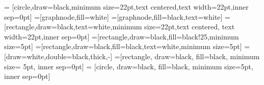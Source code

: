 \usepackage{pgfplots}
\pgfplotsset{compat=newest}
\newlength\figureheight
\newlength\figurewidth
\setlength{\figurewidth}{0.85\columnwidth}
\setlength{\figureheight}{0.618\figurewidth} %

\usepackage{tikz}
\usetikzlibrary{fadings}
\usetikzlibrary{arrows,shapes,plotmarks,decorations.pathmorphing}
\usetikzlibrary{circuits}
\usetikzlibrary{intersections}
\usetikzlibrary{scopes, arrows, fadings, patterns}
\usetikzlibrary{%
    decorations.pathreplacing,%
    decorations.pathmorphing%
}
\usetikzlibrary{positioning}
\usetikzlibrary{backgrounds}
\tikzset{>=stealth'}
 =
   [circle,draw=black,minimum size=22pt,text centered,text
     width=22pt,inner sep=0pt]
   =[graphnode,fill=white]
   =[graphnode,fill=black,text=white]
   =[rectangle,draw=black,text=white,minimum
size=22pt,text centered, text width=22pt,inner sep=0pt]
   =[rectangle,draw=black,fill=black!25,minimum size=5pt]
 =[rectangle,draw=black,fill=black,text=white,minimum
size=5pt]
  =[draw=white,double=black,thick,-]
 =[rectangle, draw=black, fill=black, minimum size=
5pt, inner sep=0pt]
 = [circle, draw=black, fill=black, minimum
size=5pt, inner sep=0pt]


\usetikzlibrary{external} %
\tikzexternalize %
\tikzexternaldisable %
\tikzset{external/force  remake=false} %

\newcommand{\inputTikZ}[1]{\tikzsetnextfilename{#1}{\tikzexternalenable}}


\usepackage{pifont}


\usepackage{etoolbox}

\makeatletter
\patchcmd{\pgfplots@environment@opt}{\label}{\@tufte@orig@label}{}{}
\makeatother

